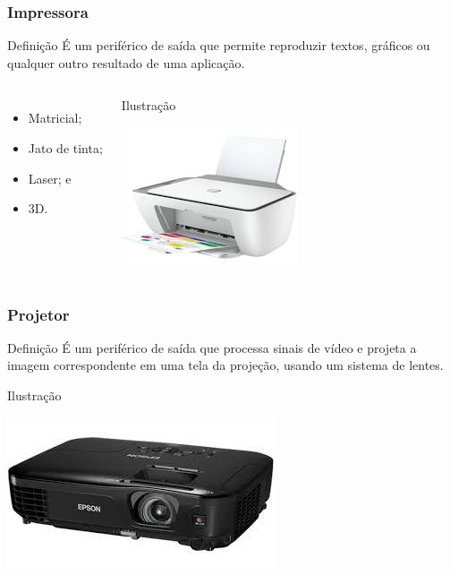 \documentclass[aspectratio=169]{beamer} %
\begin{document}
\begin{frame}
	\frametitle{Impressora}
	
	\begin{block}{Defini\c cão}
		É um periférico de saída que permite reproduzir textos, gráficos ou qualquer outro resultado de uma aplicação.
	\end{block}\vfill	
	
	\begin{columns}
		\begin{itemize}
			\item Matricial;
			\item Jato de tinta;
			\item Laser; e
			\item 3D.
		\end{itemize}

		\begin{exampleblock}{Ilustra\c cão}
			\begin{center}
				\includegraphics[scale=0.5]{img/impressora}
			\end{center}		
		\end{exampleblock}
	\end{columns}
\end{frame}

\begin{frame}
	\frametitle{Projetor}
	
	\begin{block}{Defini\c cão}
		É um periférico de saída que processa sinais de vídeo e projeta a imagem correspondente em uma tela da projeção, usando um sistema de lentes.
	\end{block}\vfill
	
	\begin{exampleblock}{Ilustra\c cão}
		\begin{center}
			\includegraphics[scale=0.5]{img/projetor}
		\end{center}		
	\end{exampleblock}
\end{frame}
\end{document}
